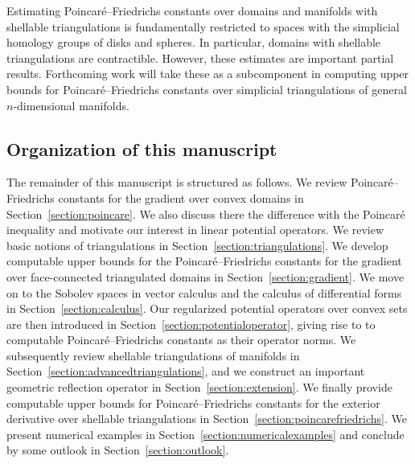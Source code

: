 \documentclass[10pt,a4paper]{article}
\begin{document}
Estimating Poincar\'e--Friedrichs constants over domains and manifolds with shellable triangulations is fundamentally restricted to spaces with the simplicial homology groups of disks and spheres. In particular, domains with shellable triangulations are contractible. However, these estimates are important partial results. Forthcoming work will take these as a subcomponent in computing upper bounds for Poincar\'e--Friedrichs constants over simplicial triangulations of general $n$-dimensional manifolds. 
\\



\subsection{Organization of this manuscript}

The remainder of this manuscript is structured as follows.
We review Poincar\'e--Friedrichs constants for the gradient over convex domains in Section~\ref{section:poincare}. 
We also discuss there the difference with the Poincar\'e inequality and motivate our interest in linear potential operators.
We review basic notions of triangulations in Section~\ref{section:triangulations}.
We develop computable upper bounds for the Poincar\'e--Friedrichs constants for the gradient over face-connected triangulated domains in Section~\ref{section:gradient}.
We move on to the Sobolev spaces in vector calculus and the calculus of differential forms in Section~\ref{section:calculus}. 
Our regularized potential operators over convex sets are then introduced in Section~\ref{section:potentialoperator}, 
giving rise to to computable Poincar\'e--Friedrichs constants as their operator norms. 
We subsequently review shellable triangulations of manifolds in Section~\ref{section:advancedtriangulations},
and we construct an important geometric reflection operator in Section~\ref{section:extension}. 
We finally provide computable upper bounds for Poincar\'e--Friedrichs constants for the exterior derivative over shellable triangulations in Section~\ref{section:poincarefriedrichs}.
We present numerical examples in Section~\ref{section:numericalexamples} and conclude by some outlook in Section~\ref{section:outlook}. 
\end{document}
